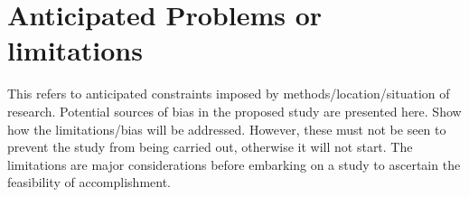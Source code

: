 \section{Anticipated Problems or limitations}

This refers to anticipated constraints imposed by methods/location/situation of research.
Potential sources of bias in the proposed study are presented here. Show how the
limitations/bias will be addressed. However, these must not be seen to prevent the study
from being carried out, otherwise it will not start. The limitations are major considerations
before embarking on a study to ascertain the feasibility of accomplishment.